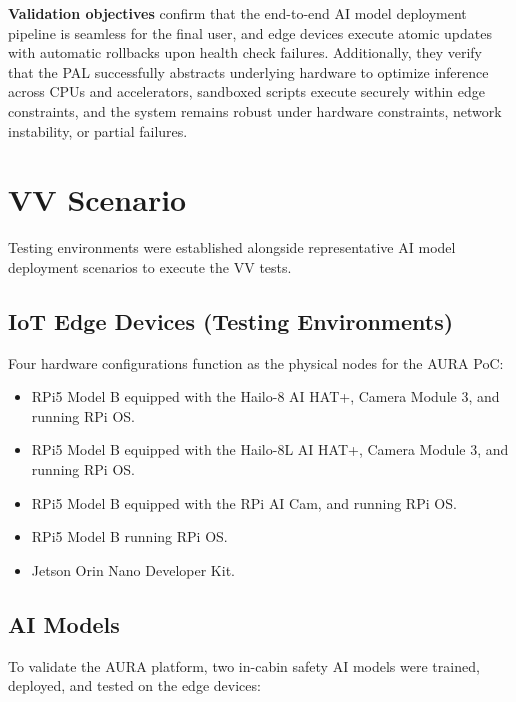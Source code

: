 \textbf{Validation objectives} confirm that the end-to-end \gls{AI} model deployment pipeline is seamless for the final user, and edge devices execute atomic updates with automatic rollbacks upon health check failures. Additionally, they verify that the \gls{PAL} successfully abstracts underlying hardware to optimize inference across \glspl{CPU} and accelerators, sandboxed scripts execute securely within edge constraints, and the system remains robust under hardware constraints, network instability, or partial failures.


\section{\texorpdfstring{\acrshort{VV}}{VV} Scenario}\label{sec:exp:scenario}

Testing environments were established alongside representative \gls{AI} model deployment scenarios to execute the \gls{VV} tests.

\subsection{\texorpdfstring{\acrshort{IoT}}{IoT} Edge Devices (Testing Environments)}

Four hardware configurations function as the physical nodes for the \gls{AURA} \gls{PoC}:

\begin{itemize}
    \item \gls{RPi}5 Model B equipped with the Hailo-8 \gls{AI} HAT+, Camera Module 3, and running \gls{RPi} \gls{OS}.
    \item \gls{RPi}5 Model B equipped with the Hailo-8L \gls{AI} HAT+, Camera Module 3, and running \gls{RPi} \gls{OS}.
    \item \gls{RPi}5 Model B equipped with the \gls{RPi} \gls{AI} Cam, and running \gls{RPi} \gls{OS}.
    \item \gls{RPi}5 Model B running \gls{RPi} \gls{OS}.
    \item Jetson Orin Nano Developer Kit. 
\end{itemize}

\subsection{\texorpdfstring{\acrshort{AI}}{AI} Models}\label{subsec:models}

To validate the \gls{AURA} platform, two in-cabin safety \gls{AI} models were trained, deployed, and tested on the edge devices:

